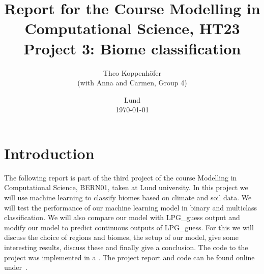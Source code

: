 





\title{ Report for the Course Modelling in Computational Science, HT23 \\[1ex]
	  \large Project 3: Biome classification}
\author{Theo Koppenhöfer \\[1ex] (with Anna and Carmen, Group 4)}
\date{Lund \\[1ex] \today}



\graphicspath{{../Project3RandomForestML/plots/}}




\usepackage{pythonhighlight}



\maketitle

\section{Introduction}
The following report is part of the third project of the course Modelling in Computational Science, BERN01, taken at Lund university.
In this project we will use machine learning to classify biomes based on climate and soil data. We will test the performance of our machine
learning model in binary and multiclass classification. We will also compare our model with LPG\_guess output
and modify our model to predict continuous outputs of LPG\_guess.
For this we will discuss the choice of regions and biomes, the setup of our model, give some interesting results, discuss these and finally give a conclusion.
The code to the project was implemented in a .
The project report and code can be found online under~\cite{Repository}.


